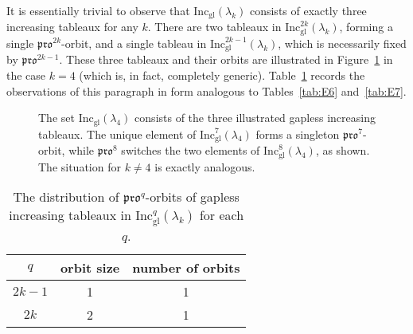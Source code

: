 \documentclass[12pt]{amsart}
\theoremstyle{definition}
\theoremstyle{remark}
\numberwithin{equation}{section}
\newcommand{\inc}{\ensuremath{\mathrm{Inc}}}
\newcommand{\incgl}{\inc_{\mathrm{gl}}}
\newcommand{\pro}{\mathfrak{pro}}
\begin{document}
It is essentially trivial to observe that $\incgl(\lambda_k)$ consists of exactly three increasing tableaux for any $k$. There are two tableaux in $\incgl^{2k}(\lambda_k)$, forming a single $\pro^{2k}$-orbit, and a single tableau in $\incgl^{2k-1}(\lambda_k)$, which is necessarily fixed by $\pro^{2k-1}$. These three tableaux and their orbits are illustrated in Figure~\ref{fig:propeller_orbits} in the case $k=4$ (which is, in fact, completely generic). Table~\ref{tab:prop} records the observations of this paragraph in form analogous to Tables~\ref{tab:E6} and~\ref{tab:E7}.

\begin{figure}[h]
\caption{The set $\incgl(\lambda_4)$ consists of the three illustrated gapless increasing tableaux. The unique element of $\incgl^7(\lambda_4)$ forms a singleton $\pro^7$-orbit, while $\pro^8$ switches the two elements of $\incgl^8(\lambda_4)$, as shown. The situation for $k \neq 4$ is exactly analogous.}\label{fig:propeller_orbits}
\end{figure}

\begin{table}[h]
\begin{tabular}{|c|c|c|}
\hline
$q$ & orbit size & number of orbits\\
  \hline
  $2k-1$ & 1 & 1\\
  \hline
  $2k$ & 2 & 1\\ 
  \hline
\end{tabular}
\caption{The distribution of $\pro^q$-orbits of gapless increasing tableaux in $\incgl^q(\lambda_{k})$ for each $q$.}
\label{tab:prop}
\end{table}
\end{document}
